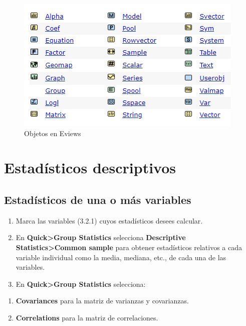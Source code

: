 \documentclass[
]{book}
\providecommand{\tightlist}{%
  \setlength{\itemsep}{0pt}\setlength{\parskip}{0pt}}
\begin{document}
\begin{figure}

{\centering \includegraphics[width=0.75\linewidth]{imagenes/3_3} 

}

\caption{Objetos en Eviews}\label{fig:unnamed-chunk-6}
\end{figure}

\hypertarget{estaduxedsticos-descriptivos}{%
\section{Estadísticos descriptivos}\label{estaduxedsticos-descriptivos}}

\hypertarget{estaduxedsticos-de-una-o-muxe1s-variables}{%
\subsection{Estadísticos de una o más variables}\label{estaduxedsticos-de-una-o-muxe1s-variables}}

\begin{enumerate}
\def\labelenumi{\arabic{enumi}.}
\tightlist
\item
  Marca las variables (3.2.1) cuyos estadísticos desees calcular.
\item
  En \textbf{Quick\textgreater Group Statistics} selecciona \textbf{Descriptive Statistics\textgreater Common sample} para obtener estadísticos relativos a cada variable individual como la media, mediana, etc., de cada una de las variables.
\item
  En \textbf{Quick\textgreater Group Statistics} selecciona:
\end{enumerate}

\begin{enumerate}
\def\labelenumi{(\alph{enumi})}
\tightlist
\item
  \textbf{Covariances} para la matriz de varianzas y covarianzas.
\item
  \textbf{Correlations} para la matriz de correlaciones.
\end{enumerate}
\end{document}
